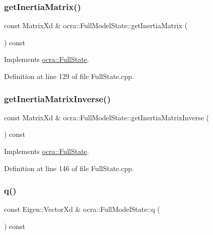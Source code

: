 \subsubsection{\texorpdfstring{get\+Inertia\+Matrix()}{getInertiaMatrix()}}
{\footnotesize\ttfamily const Matrix\+Xd \& ocra\+::\+Full\+Model\+State\+::get\+Inertia\+Matrix (\begin{DoxyParamCaption}{ }\end{DoxyParamCaption}) const\hspace{0.3cm}{\ttfamily [virtual]}}



Implements \hyperlink{classocra_1_1FullState_a5d5c2ddfaf4868f78b4621d27b500784}{ocra\+::\+Full\+State}.



Definition at line 129 of file Full\+State.\+cpp.

\hypertarget{classocra_1_1FullModelState_adf7ce7128a112c3f2b6367b6c0f6b9a2}{}\label{classocra_1_1FullModelState_adf7ce7128a112c3f2b6367b6c0f6b9a2} 
\subsubsection{\texorpdfstring{get\+Inertia\+Matrix\+Inverse()}{getInertiaMatrixInverse()}}
{\footnotesize\ttfamily const Matrix\+Xd \& ocra\+::\+Full\+Model\+State\+::get\+Inertia\+Matrix\+Inverse (\begin{DoxyParamCaption}{ }\end{DoxyParamCaption}) const\hspace{0.3cm}{\ttfamily [virtual]}}



Implements \hyperlink{classocra_1_1FullState_a10f3a888554035bf13b3f636ce4b4edc}{ocra\+::\+Full\+State}.



Definition at line 146 of file Full\+State.\+cpp.

\hypertarget{classocra_1_1FullModelState_a3a560064b1be8bd1579382aa08686904}{}\label{classocra_1_1FullModelState_a3a560064b1be8bd1579382aa08686904} 
\subsubsection{\texorpdfstring{q()}{q()}}
{\footnotesize\ttfamily const Eigen\+::\+Vector\+Xd \& ocra\+::\+Full\+Model\+State\+::q (\begin{DoxyParamCaption}{ }\end{DoxyParamCaption}) const\hspace{0.3cm}{\ttfamily [virtual]}}



